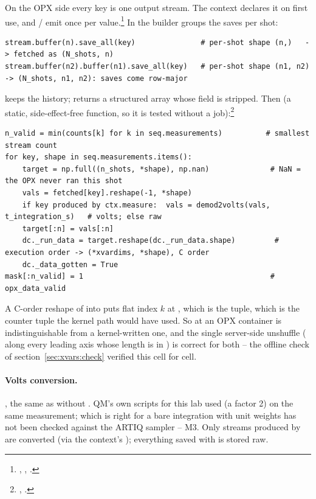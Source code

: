 On the OPX side every  key is one output stream. The
context declares it on first use, and  /  emit  once per value.\footnote{,
, .} In  the builder
groups the saves per shot:

\begin{lstlisting}[style=qua]
stream.buffer(n).save_all(key)               # per-shot shape (n,)   -> fetched as (N_shots, n)
stream.buffer(n2).buffer(n1).save_all(key)   # per-shot shape (n1, n2) -> (N_shots, n1, n2): saves come row-major
\end{lstlisting}

 keeps the history;  returns a structured
array whose \code{['value']} field is stripped. Then
 (a static, side-effect-free function, so it
is tested without a job):\footnote{, .}

\begin{lstlisting}[style=py]
n_valid = min(counts[k] for k in seq.measurements)          # smallest stream count
for key, shape in seq.measurements.items():
    target = np.full((n_shots, *shape), np.nan)              # NaN = the OPX never ran this shot
    vals = fetched[key].reshape(-1, *shape)
    if key produced by ctx.measure:  vals = demod2volts(vals, t_integration_s)   # volts; else raw
    target[:n] = vals[:n]
    dc._run_data = target.reshape(dc._run_data.shape)         # execution order -> (*xvardims, *shape), C order
    dc._data_gotten = True
mask[:n_valid] = 1                                           # opx_data_valid
\end{lstlisting}

A C-order reshape of  into  puts
flat index $k$ at , which is the
 tuple, which is the counter tuple the kernel path would have
used. So at  an OPX container is indistinguishable from a
kernel-written one, and the single server-side unshuffle
( along every leading axis whose length is
in ) is correct for both -- the offline check of
section~\ref{sec:xvars:check} verified this cell for cell.

\paragraph{Volts conversion.} , the same as  without
. QM's own scripts for this lab used
 (a factor 2) on the same 
measurement; which is right for a bare integration with unit weights has not
been checked against the ARTIQ sampler -- M3. Only streams produced by
 are converted (via the context's );
everything saved with  is stored raw.

